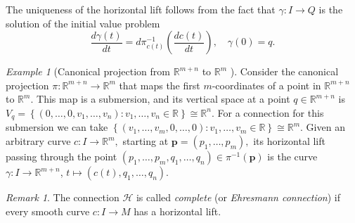 \documentclass[12pt, letterpaper, reqno]{amsart}
\theoremstyle{definition}
\theoremstyle{plain}
\theoremstyle{remark}
\newtheorem{ex}{Example}
\newtheorem{rem}{Remark}
\begin{document}
The uniqueness of the horizontal lift follows from the fact that $ \gamma: I \rightarrow Q $ is the solution of the initial value problem
$$ \frac{d\gamma(t)}{dt} = d\pi^{-1}_{c(t)} \left( \frac{dc(t)}{dt}  \right),\quad \gamma(0)=q.  $$ 
\begin{ex}[Canonical projection from $ \mathbb{R}^{m+n} $ to $ \mathbb{R}^m $  ]\label{ex:can_proj}
	\sloppy	Consider the canonical projection $ \pi: \mathbb{R}^{m+n} \rightarrow \mathbb{R}^m $ that maps the first $ m $-coordinates of a point in $ \mathbb{R}^{m+n} $  to $ \mathbb{R}^m. $ This map is a submersion, and its vertical space at a point $ q\in \mathbb{R}^{m+n} $ is $ V_q = \left\{ (0,\dots,0,v_1,\dots,v_n) : v_1,\dots,v_n\in \mathbb{R}  \right\} \cong \mathbb{R}^n. $ For a connection for this submersion we can take $ \left\{ (v_1,\dots,v_m, 0,\dots, 0): v_1,\dots,v_m\in \mathbb{R} \right\}\cong \mathbb{R}^m.  $ Given an arbitrary curve $ c: I \rightarrow \mathbb{R}^m, $ starting at $ \boldsymbol{p}= (p_1,\dots,p_m), $ its horizontal lift passing through the point $ (p_1,\dots,p_m,q_1,\dots,q_n)\in \pi^{-1}( \boldsymbol{p} ) $ is the curve $ \gamma: I \rightarrow \mathbb{R}^{m+n} $, $ t\mapsto (c(t),q_1,\dots,q_n). $   
\end{ex}
\begin{rem}
	The connection $ \mathcal{H} $ is called \textit{complete} (or \textit{Ehresmann connection})  if every smooth curve $ c: I \rightarrow {M} $ has a horizontal lift.
\end{rem}
\end{document}
